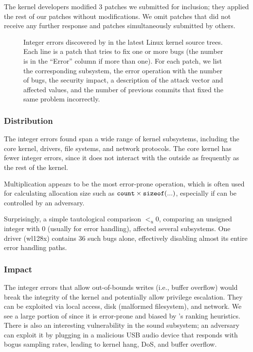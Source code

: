 The kernel developers modified 3 patches we submitted for inclusion;
they applied the rest of our patches without modifications.
%
We omit \nrbugsnoresp patches that did not receive any further response
and \nrbugsbyothers patches simultaneously submitted by others.

\begin{figure*}
\centering
\footnotesize

\caption{Integer errors discovered by \sys in the latest Linux
kernel source trees.  Each line is a patch that tries to fix one
or more bugs (the number is in the ``Error'' column if more than
one).  For each patch, we list the corresponding subsystem, the
error operation with the number of bugs, the security impact, a
description of the attack vector and affected values, and the number
of previous commits that fixed the same problem incorrectly.}
\label{f:data:linux}
\end{figure*}

\subsubsection{Distribution}

The integer errors \sys found span a wide range of kernel subsystems,
including the core kernel, drivers, file systems, and network protocols.
The core kernel has fewer integer errors, since it does not
interact with the outside as frequently as the rest of the kernel.

Multiplication appears to be the most error-prone operation, which
is often used for calculating allocation size such as $\texttt{count}
\times \texttt{sizeof}(...)$, especially if  can be controlled
by an adversary.

Surprisingly,  a simple tautological comparison $<_u 0$,
comparing an unsigned integer with 0 (usually for error handling),
affected several subsystems.
One driver (wl128x) contains 36 such bugs alone, effectively
disabling almost its entire error handling paths.

\subsubsection{Impact}

The integer errors that allow out-of-bounds writes (i.e., buffer
overflow) would break the integrity of the kernel and potentially
allow privilege escalation.  They can be exploited via local access,
disk (malformed filesystem), and network.  We see a large portion
of  since it is error-prone and biased by \sys's ranking
heuristics.
%
There is also an interesting vulnerability in the sound subsystem;
an adversary can exploit it by plugging in a malicious USB audio
device that responds with bogus sampling rates, leading to kernel
hang, DoS, and buffer overflow.

